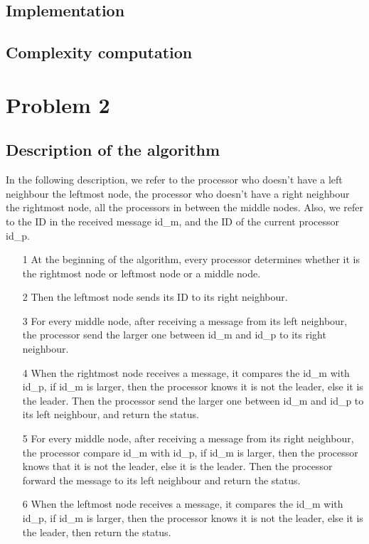 \documentclass[paper=a4, fontsize=11pt]{scrartcl} %
\numberwithin{equation}{section} %
\numberwithin{figure}{section} %
\numberwithin{table}{section} %
\begin{document}
\subsection*{Implementation}
\subsection*{Complexity computation}

\section*{Problem 2}
\subsection*{Description of the algorithm}
In the following description, we refer to the processor who doesn't have a left neighbour the leftmost node, the processor who doesn't have a right neighbour the rightmost node, all the processors in between the middle nodes. Also, we refer to the ID in the received message id\_m, and the ID of the current processor id\_p.
\begin{itemize}
	\item[1] At the beginning of the algorithm, every processor determines whether it is the rightmost node or leftmost node or a middle node.

	\item[2] Then the leftmost node sends its ID to its right neighbour.

	\item[3] For every middle node, after receiving a message from its left neighbour, the processor send the larger one between id\_m and id\_p to its right neighbour.
	\item[4] When the rightmost node receives a message, it compares the id\_m with id\_p, if id\_m is larger, then the processor knows it is not the leader, else it is the leader. Then the processor send the larger one between id\_m and id\_p to its left neighbour, and return the status.
	\item[5] For every middle node, after receiving a message from its right neighbour, the processor compare id\_m with id\_p, if id\_m is larger, then the processor knows that it is not the leader, else it is the leader. Then the processor forward the message to its left neighbour and return the status.
	\item[6] When the leftmost node receives a message, it compares the id\_m with id\_p, if id\_m is larger, then the processor knows it is not the leader, else it is the leader, then return the status.
\end{itemize}
\end{document}

